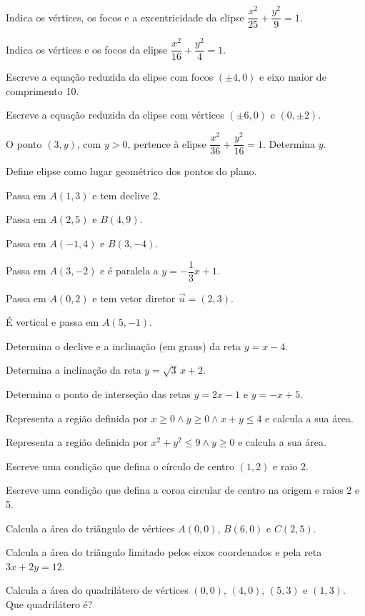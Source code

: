 \documentclass[12pt]{article}
\begin{document}
\begin{exercicios}
  \item Indica os vértices, os focos e a excentricidade da elipse $\dfrac{x^2}{25} + \dfrac{y^2}{9} = 1$.
  \item Indica os vértices e os focos da elipse $\dfrac{x^2}{16} + \dfrac{y^2}{4} = 1$.
  \item Escreve a equação reduzida da elipse com focos $(\pm 4, 0)$ e eixo maior de comprimento 10.
  \item Escreve a equação reduzida da elipse com vértices $(\pm 6, 0)$ e $(0, \pm 2)$.
  \item O ponto $(3, y)$, com $y > 0$, pertence à elipse $\dfrac{x^2}{36} + \dfrac{y^2}{16} = 1$. Determina $y$.
  \item Define elipse como lugar geométrico dos pontos do plano.
\end{exercicios}

\begin{exercicios}
  \item Passa em $A(1, 3)$ e tem declive 2.
  \item Passa em $A(2, 5)$ e $B(4, 9)$.
  \item Passa em $A(-1, 4)$ e $B(3, -4)$.
  \item Passa em $A(3, -2)$ e é paralela a $y = -\dfrac{1}{3}x + 1$.
  \item Passa em $A(0, 2)$ e tem vetor diretor $\vec u = (2, 3)$.
  \item É vertical e passa em $A(5, -1)$.
  \item Determina o declive e a inclinação (em graus) da reta $y = x - 4$.
  \item Determina a inclinação da reta $y = \sqrt{3}\,x + 2$.
  \item Determina o ponto de interseção das retas $y = 2x - 1$ e $y = -x + 5$.
\end{exercicios}

\begin{exercicios}
  \item Representa a região definida por $x \ge 0 \wedge y \ge 0 \wedge x + y \le 4$ e calcula a sua área.
  \item Representa a região definida por $x^2 + y^2 \le 9 \wedge y \ge 0$ e calcula a sua área.
  \item Escreve uma condição que defina o círculo de centro $(1, 2)$ e raio 2.
  \item Escreve uma condição que defina a coroa circular de centro na origem e raios 2 e 5.
  \item Calcula a área do triângulo de vértices $A(0, 0)$, $B(6, 0)$ e $C(2, 5)$.
  \item Calcula a área do triângulo limitado pelos eixos coordenados e pela reta $3x + 2y = 12$.
  \item Calcula a área do quadrilátero de vértices $(0, 0)$, $(4, 0)$, $(5, 3)$ e $(1, 3)$. Que quadrilátero é?
\end{exercicios}
\end{document}
